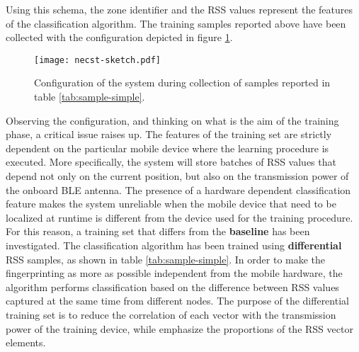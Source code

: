 Using this schema, the zone identifier and the RSS values represent the features of the classification algorithm.
The training samples reported above have been collected with the configuration depicted in figure \ref{fig:necst-sketch}.

\begin{figure}[h!tb]
\centering
\texttt{[image: necst-sketch.pdf]}
\caption[Configuration of the system during collection of samples reported in table \ref{tab:sample-simple}.]{Configuration of the system during collection of samples reported in table \ref{tab:sample-simple}.}
\label{fig:necst-sketch}
\end{figure}


Observing the configuration, and thinking on what is the aim of the training phase, a critical issue raises up. The features of the training set are strictly dependent on the particular mobile device where the learning procedure is executed. More specifically, the system will store batches of RSS values that depend not only on the current position, but also on the transmission power of the onboard BLE antenna.
The presence of a hardware dependent classification feature makes the system unreliable when the mobile device that need to be localized at runtime is different from the device used for the training procedure.\\
For this reason, a training set that differs from the \textbf{baseline} has been investigated. The classification algorithm has been trained using \textbf{differential} RSS samples, as shown in table \ref{tab:sample-simple}. In order to make the fingerprinting as more as possible independent from the mobile hardware, the algorithm performs classification based on the difference between RSS values captured at the same time from different nodes. 
The purpose of the differential training set is to reduce the correlation of each vector with the transmission power of the training device, while emphasize the proportions of the RSS vector elements.

